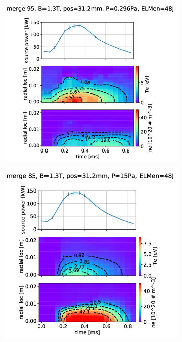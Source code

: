 \begin{figure}[ht!]
     \centering
     \begin{subfigure}{0.34\textwidth}
         \centering
         \vspace*{-0mm}
         \includegraphics[width=\textwidth,trim={60 0 134 25},clip]{Chapters/chapter3/figs/pass_1_merge95_global_fit37.png}
         \vspace*{-55mm}
         {\color{white}\caption{\phantom{ }}\label{fig:TSb}}
     \end{subfigure}
     \hfill
     \begin{subfigure}{0.285\textwidth}
         \centering
         \vspace*{-0mm}
         \includegraphics[width=\textwidth,trim={100 0 120 25},clip]{Chapters/chapter3/figs/pass_1_merge85_global_fit45.png}

\end{subfigure}
\end{figure}
